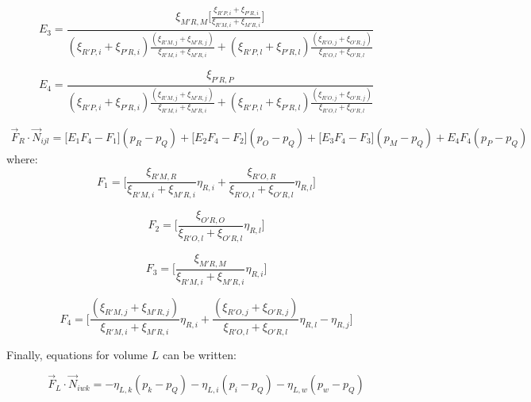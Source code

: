 \documentclass{article}
\begin{document}
\begin{displaymath}
E_{3} = \frac{\xi_{M'R,M}\Bigg[\frac{\xi_{R'P,i}+\xi_{P'R,i}}{\xi_{R'M,i}+\xi_{M'R,i}}\Bigg]}{(\xi_{R'P,i}+\xi_{P'R,i})\frac{(\xi_{R'M,j}+\xi_{M'R,j})}{\xi_{R'M,i}+\xi_{M'R,i}}
+(\xi_{R'P,l}+\xi_{P'R,l})\frac{(\xi_{R'O,j}+\xi_{O'R,j})}{\xi_{R'O,l}+\xi_{O'R,l}}}
\end{displaymath}

\begin{displaymath}
E_{4} = \frac{\xi_{P'R,P}}{(\xi_{R'P,i}+\xi_{P'R,i})\frac{(\xi_{R'M,j}+\xi_{M'R,j})}{\xi_{R'M,i}+\xi_{M'R,i}}
+(\xi_{R'P,l}+\xi_{P'R,l})\frac{(\xi_{R'O,j}+\xi_{O'R,j})}{\xi_{R'O,l}+\xi_{O'R,l}}}
\end{displaymath}

\begin{equation} \label{eq:flux_R_coefficients}
\begin{split}
\vec{F}_{R} \cdot \vec{N}_{ijl} = \Bigg[E_{1}F_{4}-F_{1}\Bigg] (p_{R}-p_{Q})+ \Bigg[E_{2}F_{4}-F_{2}\Bigg](p_{O} - p_{Q})+\Bigg[E_{3}F_{4}-F_{3}\Bigg](p_{M} - p_{Q})+E_{4}F_{4}(p_{P} - p_{Q})
\end{split}
\end{equation}
where:
\begin{displaymath}
F_{1} = \Bigg[\frac{\xi_{R'M,R}}{\xi_{R'M,i}+\xi_{M'R,i}}\eta_{R,i}+ \frac{\xi_{R'O,R}}{\xi_{R'O,l}+\xi_{O'R,l}}\eta_{R,l}\Bigg]
\end{displaymath}

\begin{displaymath}
F_{2} = \Bigg[\frac{\xi_{O'R,O}}{\xi_{R'O,l}+\xi_{O'R,l}}\eta_{R,l}\Bigg]
\end{displaymath}

\begin{displaymath}
F_{3} = \Bigg[\frac{\xi_{M'R,M}}{\xi_{R'M,i}+\xi_{M'R,i}}\eta_{R,i}\Bigg]
\end{displaymath}

\begin{displaymath}
F_{4} = \Bigg[\frac{(\xi_{R'M,j}+\xi_{M'R,j})}{\xi_{R'M,i}+\xi_{M'R,i}}\eta_{R,i}
+\frac{(\xi_{R'O,j}+\xi_{O'R,j})}{\xi_{R'O,l}+\xi_{O'R,l}} \eta_{R,l}-\eta_{R,j}\Bigg]
\end{displaymath}

Finally, equations for volume $ L $ can be written:

\begin{equation} \label{eq:flux_volume_L_with_eta}
\vec{F}_{L} \cdot \vec{N}_{iwk} = - \eta_{L,k}(p_{k} - p_{Q}) - \eta_{L,i}(p_{i} - p_{Q}) - \eta_{L,w}(p_{w} - p_{Q})
\end{equation}
\end{document}
